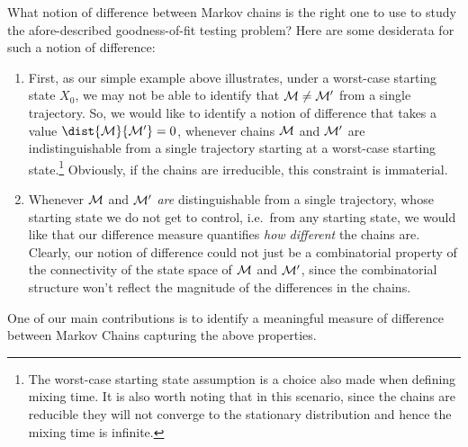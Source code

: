 What notion of difference between Markov chains is the right one to use to study the afore-described goodness-of-fit testing problem? Here are some desiderata for such a notion of difference:
%
%
\begin{enumerate}
\item First, as our simple example above illustrates, under a worst-case starting state $X_0$, we may not be able to identify that ${\cal M} \neq {\cal M}'$ from a single trajectory. So, we would like to identify a notion of difference that takes a value $\dist{\cal M}{\cal M'}= 0$, whenever chains $\cal M$ and $\cal M'$ are indistinguishable from a single trajectory starting at a worst-case starting state.\footnote{The worst-case starting state assumption is a choice also made when defining mixing time. It is also worth noting that in this scenario, since the chains are reducible they will not converge to the stationary distribution and hence the mixing time is infinite.} Obviously, if the chains are irreducible, this constraint is immaterial.

\label{distance property 1}

\item Whenever $\cal M$ and $\cal M'$ {\em are} distinguishable from a single trajectory, whose starting state we do not get to control, i.e.~from any starting state, we would like that our difference measure quantifies {\em how different} the chains are. 
Clearly, our notion of difference could not just be a combinatorial property of the connectivity of the state space of $\cal M$ and $\cal M'$, since the combinatorial structure won't reflect the magnitude of the differences in the chains. 
\label{distance property 2}
\end{enumerate}
One of our main contributions is to identify a meaningful measure of difference between Markov Chains capturing the above properties.


